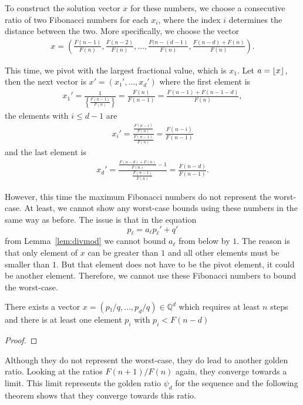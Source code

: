 To construct the solution vector $x$ for these numbers, we choose a consecutive
ratio of two Fibonacci numbers for each $x_i$, where the index $i$ determines
the distance between the two.
More specifically, we choose the vector
\begin{align*}
  x = \left(
    \frac{F(n-1)}{F(n)},
    \frac{F(n-2)}{F(n)},
    …,
    \frac{F(n-(d-1)}{F(n)},
    \frac{F(n-d) + F(n)}{F(n)} \right).
\end{align*}

This time, we pivot with the largest fractional value, which is $x_1$.
Let $a = \left\lfloor x\right\rfloor$, then the next vector is $x' = (x₁', …, x_d')$ where
the first element is
\begin{align*}
  x_1'
  = \frac{1}{\left\{\frac{F(n-1)}{F(n)}\right\}}
  = \frac{F(n)}{F(n-1)}
  = \frac{F(n-1) + F(n-1-d)}{F(n)},
\end{align*}
the elements with $i ≤ d - 1$ are
\begin{align*}
  x_i'
  = \frac{\frac{F(n-i)}{F(n)}}{\frac{F(n-1)}{F(n)}}
  = \frac{F(n-i)}{F(n-1)}
\end{align*}
and the last element is
\begin{align*}
  x_d'
  = \frac{\frac{F(n-d) + F(n)}{F(n)} - 1}{\frac{F(n-1)}{F(n)}}
  = \frac{F(n-d)}{F(n-1)}.
\end{align*}

However, this time the maximum Fibonacci numbers do not represent the worst-case.
At least, we cannot show any worst-case bounds using these numbers in the same way as before.
The issue is that in the equation
\[
  p_ℓ = a_ℓ p_ℓ' + q'
\]
from Lemma~\ref{lem:divmod} we cannot bound $a_ℓ$ from below by $1$.
The reason is that only element of $x$ can be greater than $1$
and all other elements must be smaller than $1$.
But that element does not have to be the pivot element,
it could be another element.
Therefore, we cannot use these Fibonacci numbers to bound the worst-case.

\begin{theorem}
  There exists a vector $x = (p₁/q, …, p_d/q) ∈ ℚ^d$ which requires at least $n$ steps
  and there is at least one element $p_i$ with $p_i < F(n-d)$
\end{theorem}

\begin{proof}
\end{proof}

Although they do not represent the worst-case,
they do lead to another golden ratio.
Looking at the ratios $F(n+1)/F(n)$ again,
they converge towards a limit.
This limit represents the golden ratio $ψ_d$ for the sequence and
the following theorem shows that they converge towards this ratio.

